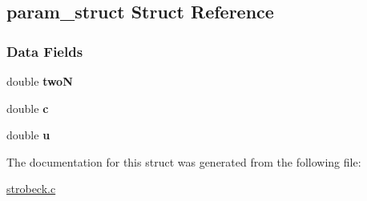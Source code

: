 \hypertarget{structparam__struct}{\subsection{param\-\_\-struct Struct Reference}
\label{structparam__struct}
}
\subsubsection*{Data Fields}
\begin{DoxyCompactItemize}
\item 
\hypertarget{structparam__struct_aa95786d09b8170f34cbe2fbbe043d217}{double {\bfseries two\-N}}\label{structparam__struct_aa95786d09b8170f34cbe2fbbe043d217}

\item 
\hypertarget{structparam__struct_ae5493bea2e917530ac906a7dfb53fc5f}{double {\bfseries c}}\label{structparam__struct_ae5493bea2e917530ac906a7dfb53fc5f}

\item 
\hypertarget{structparam__struct_a7f2b2a3750829b579aece4ea74d7fdb2}{double {\bfseries u}}\label{structparam__struct_a7f2b2a3750829b579aece4ea74d7fdb2}

\end{DoxyCompactItemize}


The documentation for this struct was generated from the following file\-:\begin{DoxyCompactItemize}
\item 
\hyperlink{strobeck_8c}{strobeck.\-c}\end{DoxyCompactItemize}

